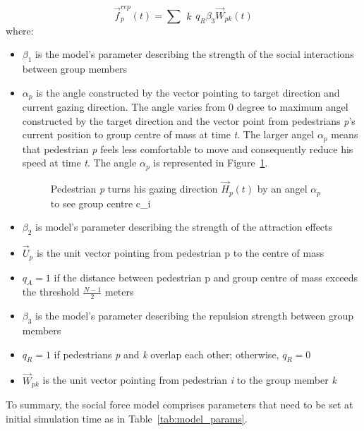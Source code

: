 \documentclass[a4paper,11pt,phdthesis,singlespace,twoside]{cssethesis}
\begin{document}
\begin{equation}
\vec{f}_{p}^{rep}(t) = \sum{\substack{k}}q_{R}\beta_{3}\vec{W}_{pk}(t)
\end{equation}
where:
\begin{itemize}
  \item $\beta_{1}$ is the model's parameter describing the strength of the social interactions between group members
	\item $\alpha_{p}$ is the angle constructed by the vector pointing to target direction and current gazing direction. The angle varies from 0 degree to maximum angel constructed by the target direction and the vector point from pedestrians \textit{p}'s current position to group centre of mass at time \textit{t}. The larger angel $\alpha_{p}$ means that pedestrian \textit{p} feels less comfortable to move and consequently reduce his speed at time \textit{t}. The angle $\alpha_{p}$ is represented in Figure~\ref{fig:alpha_vision}.
\begin{figure}[ht]
\begin{center}
\end{center}
\caption{Pedestrian \textit{p} turns his gazing direction \begin{math}\vec{H}_{p}(t) \end{math} by an angel \begin{math} \alpha_{p} \end{math} to see group centre c_{i}}
\label{fig:alpha_vision}
\end{figure}	
	\item $\beta_{2}$ is model's parameter describing the strength of the attraction effects
	\item  \begin{math}\vec{U}_{p} \end{math} is the unit vector pointing from pedestrian p to the centre of mass
	\item $q_{A}=1$ if the distance between pedestrian p and group centre of mass exceeds the threshold \begin{math}\frac{N-1}{2} \end{math} meters
	\item $\beta_{3}$ is the model's parameter describing the repulsion strength between group members
	\item $q_{R} = 1$ if pedestrians \textit{p} and \textit{k} overlap each other; otherwise, $q_{R} = 0$
	\item \begin{math}\vec{W}_{pk}\end{math} is the unit vector pointing from pedestrian \textit{i} to the group member \textit{k} 
\end{itemize}	
To summary, the social force model comprises parameters that need to be set at initial simulation time as in Table~\ref{tab:model_params}.
\end{document}
